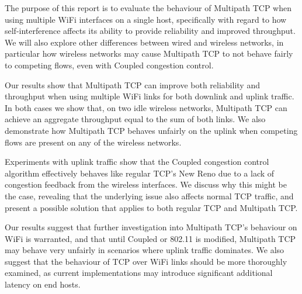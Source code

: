 \documentclass[12pt,a4paper]{article}
\begin{document}
The purpose of this report is to evaluate the behaviour of Multipath TCP when
using multiple WiFi interfaces on a single host, specifically with regard to
how self-interference affects its ability to provide reliability and improved
throughput. We will also explore other differences between wired and wireless
networks, in particular how wireless networks may cause Multipath TCP to not
behave fairly to competing flows, even with Coupled congestion control.

Our results show that Multipath TCP can improve both reliability and throughput
when using multiple WiFi links for both downlink and uplink traffic. In both
cases we show that, on two idle wireless networks, Multipath TCP can achieve an
aggregate throughput equal to the sum of both links. We also demonstrate how
Multipath TCP behaves unfairly on the uplink when competing flows are present on
any of the wireless networks.

Experiments with uplink traffic show that the Coupled congestion control
algorithm effectively behaves like regular TCP's New Reno due to a lack of
congestion feedback from the wireless interfaces. We discuss why this might be
the case, revealing that the underlying issue also affects normal TCP traffic,
and present a possible solution that applies to both regular TCP and Multipath
TCP.

Our results suggest that further investigation into Multipath TCP's behaviour on
WiFi is warranted, and that until Coupled or 802.11 is modified, Multipath TCP
may behave very unfairly in scenarios where uplink traffic dominates. We also
suggest that the behaviour of TCP over WiFi links should be more thoroughly
examined, as current implementations may introduce significant additional
latency on end hosts.
\end{document}
